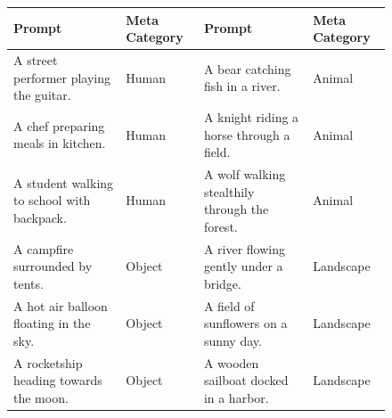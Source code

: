\begin{figure}[!h]
    \vspace{1.5em}
    \centering
    \label{tab:supp_text_prompt_vid}
    \vspace{-1em}
    \begin{tabular}{>{\centering\arraybackslash}p{5.5cm}>{\centering\arraybackslash}p{1.9cm}|>{\centering\arraybackslash}p{6.3cm}>{\centering\arraybackslash}p{1.9cm}} 
        \hline
        Prompt & Meta Category & Prompt & Meta Category \\
        \hline
        A street performer playing the guitar. & Human & A bear catching fish in a river. &  Animal \\
        A chef preparing meals in kitchen. & Human & A knight riding a horse through a field. &  Animal \\
        A student walking to school with backpack. & Human & A wolf walking stealthily through the forest. &  Animal \\
        A campfire surrounded by tents. & Object & A river flowing gently under a bridge. &  Landscape \\
        A hot air balloon floating in the sky. & Object & A field of sunflowers on a sunny day. &  Landscape \\
        A rocketship heading towards the moon. & Object & A wooden sailboat docked in a harbor. &  Landscape \\
        \hline
    \end{tabular}
\end{figure}


